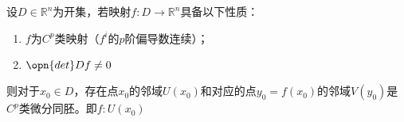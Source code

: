 
\begin{issues}
\issueDraft
\end{issues}
\begin{theorem}{}
设$D\in \mathbb R^n$为开集，若映射$f:D\rightarrow \mathbb R^n$具备以下性质：
\begin{enumerate}
\item $f$为$C^p$类映射（$f^i$的$p$阶偏导数连续）；
\item $\opn{det}Df\neq 0$
\end{enumerate}
则对于$x_0\in D$，存在点$x_0$的邻域$U(x_0)$和对应的点$y_0=f(x_0)$的邻域$V(y_0)$是$C^p$类微分同胚。即$f:U(x_0)$
\end{theorem}



